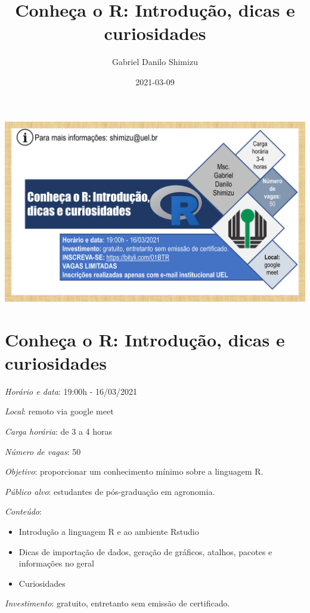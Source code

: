 \documentclass[
]{book}
\title{Conheça o R: Introdução, dicas e curiosidades}
\author{Gabriel Danilo Shimizu}
\date{2021-03-09}
\providecommand{\tightlist}{%
  \setlength{\itemsep}{0pt}\setlength{\parskip}{0pt}}
\begin{document}
\maketitle

{
\setcounter{tocdepth}{1}
\tableofcontents
}
\includegraphics{folder.png}

\hypertarget{conheuxe7a-o-r-introduuxe7uxe3o-dicas-e-curiosidades}{%
\chapter{Conheça o R: Introdução, dicas e curiosidades}\label{conheuxe7a-o-r-introduuxe7uxe3o-dicas-e-curiosidades}}

\emph{Horário e data}: 19:00h - 16/03/2021

\emph{Local}: remoto via google meet

\emph{Carga horária}: de 3 a 4 horas

\emph{Número de vagas}: 50

\emph{Objetivo}: proporcionar um conhecimento mínimo sobre a linguagem R.

\emph{Público alvo}: estudantes de pós-graduação em agronomia.

\emph{Conteúdo}:

\begin{itemize}
\tightlist
\item
  Introdução a linguagem R e ao ambiente Rstudio
\item
  Dicas de importação de dados, geração de gráficos, atalhos, pacotes e informações no geral
\item
  Curiosidades
\end{itemize}

\emph{Investimento}: gratuito, entretanto sem emissão de certificado.
\end{document}
